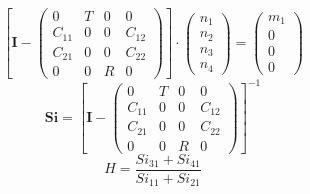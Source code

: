 \[ \left[ \mathbf{I}  - \left(\begin{smallmatrix} 0 & T & 0 & 0 \\ C_{11} & 0 & 0 & C_{12} \\ C_{21} & 0 & 0 & C_{22} \\ 0 & 0 & R & 0 \end{smallmatrix}\right)\right] \cdot \left(\begin{smallmatrix} n_{1} \\ n_{2} \\ n_{3} \\ n_{4} \end{smallmatrix}\right) = \left(\begin{smallmatrix} m_{1} \\ 0 \\ 0 \\ 0 \end{smallmatrix}\right) \]
\[ \mathbf{Si} = \left[ \mathbf{I}  - \left(\begin{smallmatrix} 0 & T & 0 & 0 \\ C_{11} & 0 & 0 & C_{12} \\ C_{21} & 0 & 0 & C_{22} \\ 0 & 0 & R & 0 \end{smallmatrix}\right) \right]^{-1} \]
\[ H = \frac{ Si_{31} + Si_{41} }{ Si_{11} + Si_{21} }  \]
